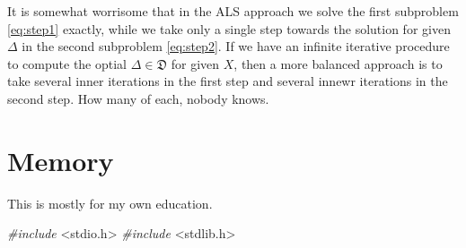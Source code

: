 \documentclass[
  12pt,
]{article}
\newenvironment{Shaded}{\begin{snugshade}}{\end{snugshade}}
\newcommand{\ImportTok}[1]{#1}
\newcommand{\PreprocessorTok}[1]{\textcolor[rgb]{0.56,0.35,0.01}{\textit{#1}}}
\begin{document}
It is somewhat worrisome that in the ALS approach we solve the first subproblem \eqref{eq:step1} exactly, while we take only a single step towards the solution for given \(\Delta\) in the second subproblem \eqref{eq:step2}. If we have an
infinite iterative procedure to compute the optial \(\Delta\in\mathfrak{D}\) for given \(X\), then
a more balanced approach is to take several inner iterations in the first step and several
innewr iterations in the second step. How many of each, nobody knows.

\section{Memory}\label{memory}

This is mostly for my own education.

\begin{Shaded}
\begin{Highlighting}[]
\PreprocessorTok{\#include }\ImportTok{\textless{}stdio.h\textgreater{}}
\PreprocessorTok{\#include }\ImportTok{\textless{}stdlib.h\textgreater{}}


\end{Highlighting}
\end{Shaded}
\end{document}

